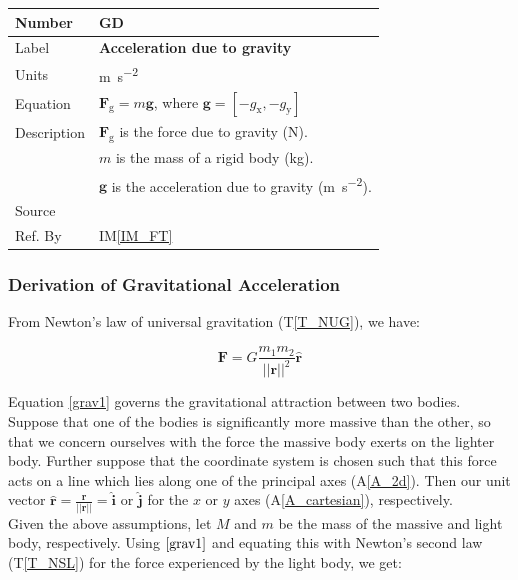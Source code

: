 \documentclass[12pt]{article}
\newcommand{\colAwidth}{0.13\textwidth}
\newcommand{\colBwidth}{0.82\textwidth}
\newcounter{defnum} %
\newcommand{\aref}[1]{A\ref{#1}}
\begin{document}
\noindent
\begin{minipage}{\textwidth}
\renewcommand*{\arraystretch}{1.5}
\begin{tabular}{| p{\colAwidth} | p{\colBwidth} |}
	\hline
	\rowcolor[gray]{0.9}
	Number & GD{defnum}\thedefnum \label{GD_GA}\\
	\hline
	Label & \textbf{Acceleration due to gravity} \\
	\hline
	Units & \si{\metre\per\second\tothe{2}} \\
	\hline
	Equation & $\mathbf{F}_\mathrm{g} = m\mathbf{g}$, where $\mathbf{g} = [-g_\mathrm{x}, -g_\mathrm{y}]$ \\
	\hline
	Description & 
	$\mathbf{F}_\mathrm{g}$ is the force due to gravity (\si{\newton}). \\
	& $m$ is the mass of a rigid body (\si{\kilogram}). \\
	& $\mathbf{g}$ is the acceleration due to gravity (\si{\metre\per\second\tothe{2}}). \\
	\hline
	Source & \\
	\hline
	Ref. By & IM\ref{IM_FT} \\
	\hline
\end{tabular}	
\end{minipage}


\subsubsection*{Derivation of Gravitational Acceleration}

From Newton's law of universal gravitation (T\ref{T_NUG}), we have:

\begin{equation}
\mathbf{F} = G\frac{m_1m_2}{||\mathbf{r}||^2}\mathbf{\hat{r}} \label{grav1}
\end{equation}

\noindent 
Equation \ref{grav1} governs the gravitational attraction between two bodies. Suppose that one of the bodies is significantly
more massive than the other, so that we concern ourselves with the force the massive body exerts on the lighter body. Further
suppose that the coordinate system is chosen such that this force acts on a line which lies along one of the principal axes (\aref{A_2d}).
Then our unit vector $\mathbf{\hat{r}} = \frac{\mathbf{r}}{||\mathbf{r}||}
= \mathbf{\hat{i}}$ or $\mathbf{\hat{j}}$ for the $x$ or $y$ axes (\aref{A_cartesian}), respectively. \\
\newline
Given the above assumptions, let $M$ and $m$ be the mass of the massive and light body, respectively. Using $\ref{grav1}$ and equating this with Newton's second law (T\ref{T_NSL}) for the force experienced by the light body, we get:
\end{document}
